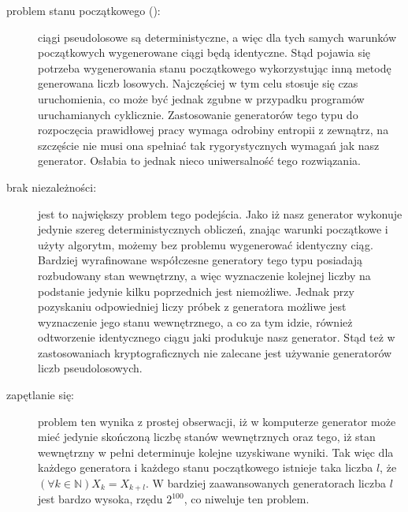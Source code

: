 \begin{description}
\item[problem stanu początkowego ():] ciągi pseudolosowe są deterministyczne, a więc dla tych samych warunków początkowych wygenerowane ciągi będą identyczne. Stąd pojawia się potrzeba wygenerowania stanu początkowego wykorzystując inną metodę generowana liczb losowych. Najczęściej w tym celu stosuje się czas uruchomienia, co może być jednak zgubne w przypadku programów uruchamianych cyklicznie. Zastosowanie generatorów tego typu do rozpoczęcia prawidłowej pracy wymaga odrobiny entropii z zewnątrz, na szczęście nie musi ona spełniać tak rygorystycznych wymagań jak nasz generator. Osłabia to jednak nieco uniwersalność tego rozwiązania.
\item[brak niezależności:] jest to największy problem tego podejścia. Jako iż nasz generator wykonuje jedynie szereg deterministycznych obliczeń, znając warunki początkowe i użyty algorytm, możemy bez problemu wygenerować identyczny ciąg. Bardziej wyrafinowane współczesne generatory tego typu posiadają rozbudowany stan wewnętrzny, a więc wyznaczenie kolejnej liczby na podstanie jedynie kilku poprzednich jest niemożliwe. Jednak przy pozyskaniu odpowiedniej liczy próbek z generatora możliwe jest wyznaczenie jego stanu wewnętrznego, a co za tym idzie, również odtworzenie identycznego ciągu jaki produkuje nasz generator. Stąd też w zastosowaniach kryptograficznych nie zalecane jest używanie generatorów liczb pseudolosowych.
\item[zapętlanie się:] problem ten wynika z prostej obserwacji, iż w komputerze generator może mieć jedynie skończoną liczbę stanów wewnętrznych oraz tego, iż stan wewnętrzny w pełni determinuje kolejne uzyskiwane wyniki. Tak więc dla każdego generatora i każdego stanu początkowego istnieje taka liczba $l$,  że $( \forall{k} \in \mathbb{N} ) X_{k} = X_{k+l} $. W bardziej zaawansowanych generatorach liczba $l$ jest bardzo wysoka, rzędu $2^{100}$, co niweluje ten problem.
\end{description}
